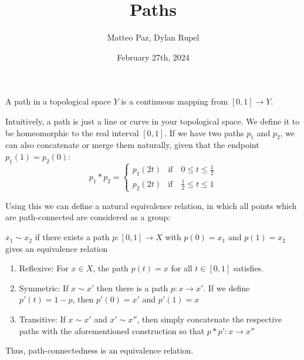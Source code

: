 \documentclass{article}
\author{Matteo Paz, Dylan Rupel}
\date{February 27th, 2024}
\title{Paths}
\begin{document}
\maketitle
\begin{definition}
    A path in a topological space $Y$ is a continuous mapping from $[0,1] \to Y$.
\end{definition}

Intuitively, a path is just a line or curve in your topological space. We define it to be homeomorphic
to the real interval $[0,1]$. If we have two paths $p_1$ and $p_2$, we can also concatenate or merge
them naturally, given that the endpoint $p_1(1) = p_2(0)$:
\[
p_1 * p_2 = 
\begin{cases} 
    p_1(2t) & \text{if} \quad 0 \leq t \leq \frac{1}{2} \\
    p_2(2t) & \text{if} \quad \frac{1}{2} \leq t \leq 1
\end{cases}
\]

Using this we can define a natural equivalence relation, in which all points which are path-connected
are considered as a group:
\begin{proposition}
    $x_1 \sim x_2$ if there exists a path $p: [0,1] \to X$ with $p(0) = x_1$ and $p(1) = x_2$ gives
    an equivalence relation
\end{proposition}
\pf
\begin{enumerate}
    \item Reflexive: For $x \in X$, the path $p(t) = x$ for all $t \in [0,1]$ satisfies.
    \item Symmetric: If $x \sim x'$ then there is a path $p: x \to x'$. If we define $p'(t) = 1-p$, then $p'(0) = x'$ and $p'(1) = x$
    \item Transitive: If $x \sim x'$ and $x' \sim x''$, then simply concatenate the respective paths with the aforementioned construction so that $p * p': x \to x''$
\end{enumerate}

Thus, path-connectedness is an equivalence relation.
\end{document}
